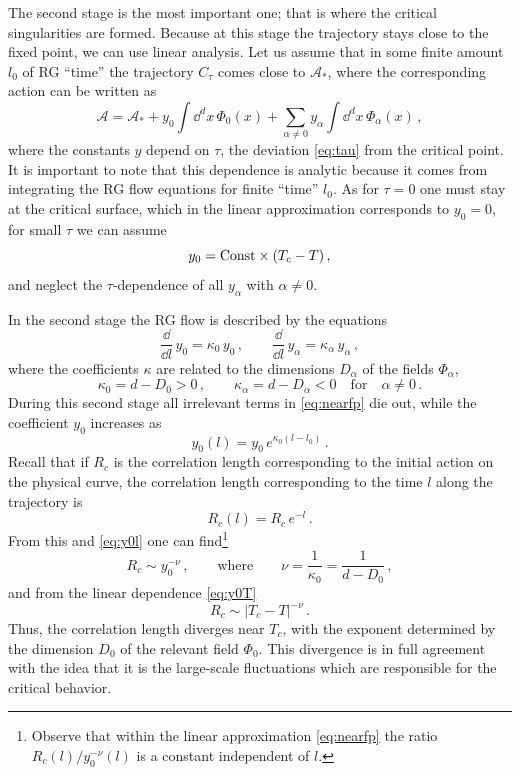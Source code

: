 The second stage is the most important one; that is where the critical
singularities are formed. Because at this stage the trajectory stays close to the
fixed point, we can use linear analysis. Let us assume that in some finite amount
$l_0$ of RG ``time'' the trajectory $C_\tau$ comes close to $\mathcal A_*$, where
the corresponding action can be written as
\begin{equation}\label{eq:nearfp}
\mathcal A=\mathcal A_*+y_0\int \dd^dx\,\Phi_0(x)+\sum_{\alpha\neq0}y_\alpha\int \dd^dx\,\Phi_\alpha(x)\,,
\end{equation}
where the constants $y$ depend on $\tau$, the deviation \eqref{eq:tau} from the
critical point. It is important to note that this dependence is analytic because
it comes from integrating the RG flow equations for finite ``time'' $l_0$. As for
$\tau=0$ one must stay at the critical surface, which in the linear approximation
corresponds to $y_0=0$, for small $\tau$ we can assume
\begin{equation}\label{eq:y0T}
y_0=\text{Const}\times(T_c-T)\,,
\end{equation}
and neglect the $\tau$-dependence of all $y_\alpha$ with $\alpha\neq0$.

In the second stage the RG flow is described by the equations
\[
\frac{\dd}{\dd l}\,y_0=\kappa_0\,y_0\,,\qquad\frac{\dd}{\dd l}\,y_\alpha=\kappa_\alpha\,y_\alpha\,,
\]
where the coefficients $\kappa$ are related to the dimensions $D_\alpha$ of the
fields $\Phi_\alpha$,
\[
\kappa_0=d-D_0>0\,,\qquad\kappa_\alpha=d-D_\alpha<0\quad\text{for}\quad\alpha\neq0\,.
\]
During this second stage all irrelevant terms in \eqref{eq:nearfp} die out, while
the coefficient $y_0$ increases as
\begin{equation}\label{eq:y0l}
y_0(l)=y_0\,e^{\kappa_0(l-l_0)}\,.
\end{equation}
Recall that if $R_c$ is the correlation length corresponding to the initial action
on the physical curve, the correlation length corresponding to the time $l$ along
the trajectory is
\[
R_c(l)=R_c\,e^{-l}\,.
\]
From this and \eqref{eq:y0l} one can find\footnote{Observe that within the linear
approximation \eqref{eq:nearfp} the ratio $R_c(l)/y_0^{-\nu}(l)$ is a constant
independent of $l$.}
\begin{equation}\label{eq:Rcnu}
R_c\sim y_0^{-\nu}\,,\qquad\text{where}\qquad\nu=\frac1{\kappa_0}=\frac1{d-D_0}\,,
\end{equation}
and from the linear dependence \eqref{eq:y0T}
\[
R_c\sim|T_c-T|^{-\nu}\,.
\]
Thus, the correlation length diverges near $T_c$, with the exponent determined by
the dimension $D_0$ of the relevant field $\Phi_0$. This divergence is in full
agreement with the idea that it is the large-scale fluctuations which are
responsible for the critical behavior.

